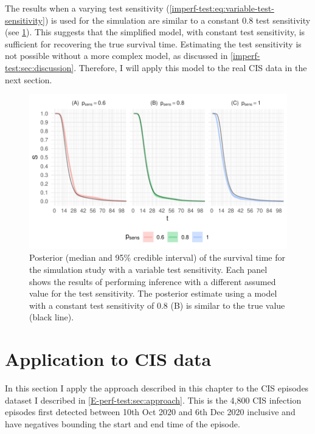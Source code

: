 \documentclass[thesis.tex]{subfiles}
\begin{document}
The results when a varying test sensitivity (\cref{imperf-test:eq:variable-test-sensitivity}) is used for the simulation are similar to a constant 0.8 test sensitivity (see \cref{imperf-test:fig:variable-test-sensitivity}).
This suggests that the simplified model, with constant test sensitivity, is sufficient for recovering the true survival time.
Estimating the test sensitivity is not possible without a more complex model, as discussed in \cref{imperf-test:sec:discussion}.
Therefore, I will apply this model to the real CIS data in the next section.
\begin{figure}
    \includegraphics[width=\textwidth]{cis-imperfect-testing/sim-variable-sensitivity}
  \caption[Simulation study results with varying test sensitivity]{%
    Posterior (median and 95\% credible interval) of the survival time for the simulation study with a variable test sensitivity.
    Each panel shows the results of performing inference with a different assumed value for the test sensitivity.
    The posterior estimate using a model with a constant test sensitivity of 0.8 (B) is similar to the true value (black line).
  }
  \label{imperf-test:fig:variable-test-sensitivity}
\end{figure}

\section{Application to CIS data} \label{imperf-test:sec:application}

In this section I apply the approach described in this chapter to the CIS episodes dataset I described in \cref{E-perf-test:sec:approach}.
This is the 4,800 CIS infection episodes first detected between 10th Oct 2020 and 6th Dec 2020 inclusive and have negatives bounding the start and end time of the episode.
\end{document}
